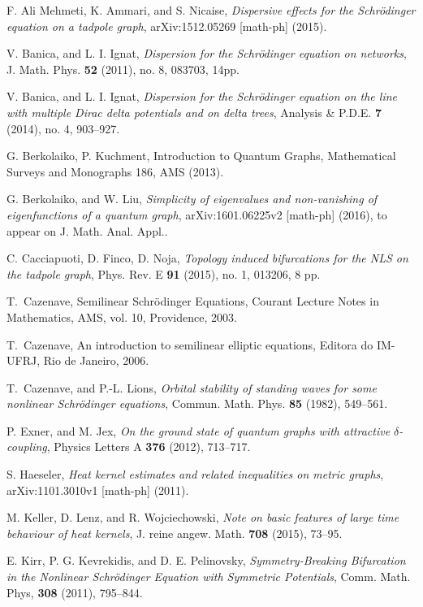 \documentclass[11pt,a4paper]{amsart}
\theoremstyle{definition}
\numberwithin{equation}{section}
\begin{document}
\begin{thebibliography}{99}
{ F. Ali Mehmeti, K. Ammari, and S. Nicaise, \emph{Dispersive effects for the Schr\"odinger equation on a tadpole graph}, arXiv:1512.05269 [math-ph] (2015).

\bibitem{[BI1]}V. Banica, and L. I. Ignat, \emph{Dispersion for the Schr\"odinger equation on networks},  J. Math. Phys. \textbf{52} (2011), no. 8, 083703, 14pp.

\bibitem{[BI2]}V. Banica, and  L. I. Ignat, \emph{Dispersion for the Schr\"odinger equation on the line with multiple Dirac delta potentials and on delta trees},  Analysis \& P.D.E. {\bf 7} (2014), no. 4, 903--927.

 G. Berkolaiko, P. Kuchment, Introduction to Quantum Graphs, Mathematical Surveys and Monographs 186,  AMS (2013).

 G. Berkolaiko, and  W. Liu, \emph{Simplicity of eigenvalues and non-vanishing of eigenfunctions of a quantum graph}, arXiv:1601.06225v2 [math-ph] (2016), to appear on J. Math. Anal. Appl..

 C. Cacciapuoti, D. Finco, D. Noja, \emph{Topology induced bifurcations for the NLS on the tadpole graph}, Phys. Rev. E
\textbf{91} (2015), no. 1,  013206, 8 pp.

T.~Cazenave, {S}emilinear {S}chr\"{o}dinger {E}quations, Courant Lecture Notes in Mathematics, AMS, vol. 10, Providence, 2003.

T.~Cazenave, An introduction to semilinear elliptic equations, Editora
  do IM-UFRJ, Rio de Janeiro, 2006.

\bibitem{[CL]}
T.~Cazenave, and P.-L. Lions, \emph{Orbital stability of standing waves for some
  nonlinear {S}chr\"odinger equations}, Commun. Math. Phys. \textbf{85} (1982),
  549--561.

 P. Exner, and M. Jex, \emph{On the ground state of quantum graphs with attractive $\delta$-coupling}, Physics Letters A \textbf{376} (2012), 713--717.

 S. Haeseler, \emph{Heat kernel estimates and related inequalities on metric graphs}, arXiv:1101.3010v1 [math-ph] (2011).

 M. Keller, D. Lenz, and  R. Wojciechowski, \emph{Note on basic features of large time behaviour of heat kernels}, J. reine angew. Math. \textbf{708} (2015), 73--95.

 E. Kirr, P. G. Kevrekidis, and D. E. Pelinovsky, \emph{Symmetry-Breaking Bifurcation in the Nonlinear Schr\"odinger Equation with Symmetric Potentials}, Comm. Math. Phys, {\bf 308} (2011), 795--844.

}
\end{thebibliography}
\end{document}
